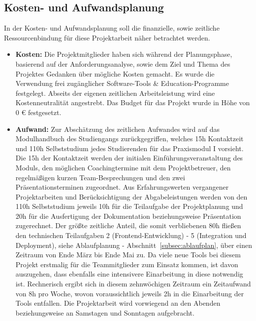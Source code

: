 \subsection{Kosten- und Aufwandsplanung}\label{subsec:Kosten-Aufwandsplanung}
In der Kosten- und Aufwandsplanung soll die finanzielle, sowie zeitliche Ressourcenbindung für diese Projektarbeit näher betrachtet werden.
\begin{itemize}[itemsep=1em, leftmargin=*]
    \item\textbf{Kosten:} Die Projektmitglieder haben sich während der Planungsphase, basierend auf der Anforderungsanalyse, sowie dem Ziel und Thema des Projektes Gedanken über mögliche Kosten gemacht.
    Es wurde die Verwendung frei zugänglicher Software-Tools \& Education-Programme festgelegt.
    Abseits der eigenen zeitlichen Arbeitsleistung wird eine Kostenneutralität angestrebt.
    Das Budget für das Projekt wurde in Höhe von 0 € festgesetzt.

    \item\textbf{Aufwand:} Zur Abschätzung des zeitlichen Aufwandes wird auf das Modulhandbuch des Studiengangs zurückgegriffen, welches 15h Kontaktzeit und 110h Selbststudium jedes Studierenden für das Praxismodul I vorsieht.
    Die 15h der Kontaktzeit werden der initialen Einführungsveranstaltung des Moduls, den möglichen Coachingtermine mit dem Projektbetreuer, den regelmäßigen kurzen Team-Besprechungen und den zwei Präsentationsterminen zugeordnet.
    Aus Erfahrungswerten vergangener Projektarbeiten und Berücksichtigung der Abgabeleistungen werden von den 110h Selbststudium jeweils 10h für die Teilaufgabe der Projektplanung und 20h für die Ausfertigung der Dokumentation beziehungsweise Präsentation zugerechnet.
    Der größte zeitliche Anteil, die somit verbliebenen 80h fließen den technischen Teilaufgaben 2 (Frontend-Entwicklung) - 5 (Integration und Deployment), siehe Ablaufplanung - Abschnitt~\ref{subsec:ablaufplan}, über einen Zeitraum von Ende März bis Ende Mai zu.
    Da viele neue Tools bei diesem Projekt erstmalig für die Teammitglieder zum Einsatz kommen, ist davon auszugehen, dass ebenfalls eine intensivere Einarbeitung in diese notwendig ist.
    Rechnerisch ergibt sich in diesem zehnwöchigen Zeitraum ein Zeitaufwand von 8h pro Woche, wovon voraussichtlich jeweils 2h in die Einarbeitung der Tools entfallen.
    Die Projektarbeit wird vorwiegend an den Abenden beziehungsweise an Samstagen und Sonntagen aufgebracht.
\end{itemize}

